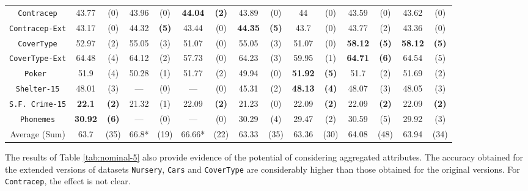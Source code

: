 \begin{sidewaystable*}[ph!]
\begin{tabular}{c|cc|cc|cc|cc|cc|cc|cc}
{\tt Contracep}     & 43.77    & (0)    & 43.96    & (0)    &{\bf44.04}&{\bf(2)}& 43.89    & (0)    & 44       & (0)    & 43.59    & (0)              & 43.62    & (0)      \\
{\tt Contracep-Ext} & 43.17    & (0)    & 44.32    &{\bf(5)}& 43.44    & (0)    &{\bf44.35}&{\bf(5)}& 43.7     & (0)    & 43.77    & (2)              & 43.36    & (0)      \\
{\tt CoverType}     & 52.97    & (2)    & 55.05    & (3)    & 51.07    & (0)    & 55.05    & (3)    & 51.07    & (0)    &{\bf58.12}&{\bf(5)}          &{\bf58.12}& {\bf(5)} \\
{\tt CoverType-Ext} & 64.48    & (4)    & 64.12    & (2)    & 57.73    & (0)    & 64.23    & (3)    & 59.95    & (1)    &{\bf64.71}&{\bf(6)}          & 64.54    & (5)      \\
{\tt Poker }        & 51.9     & (4)    & 50.28    & (1)    & 51.77    & (2)    & 49.94    & (0)    &{\bf51.92}&{\bf(5)}& 51.7     & (2)              & 51.69    & (2)      \\
{\tt Shelter-15}    & 48.01    & (3)    & ---      & (0)    & ---      & (0)    & 45.31    & (2)    &{\bf48.13}&{\bf(4)}& 48.07    & (3)              & 48.05    & (3)      \\  
{\tt S.F. Crime-15} &{\bf22.1} &{\bf(2)}& 21.32    & (1)    & 22.09    &{\bf(2)}& 21.23    & (0)    & 22.09    &{\bf(2)}& 22.09    &{\bf(2)}          & 22.09    & {\bf(2)} \\
{\tt Phonemes}      &{\bf30.92}&{\bf(6)}& ---      & (0)    & ---      & (0)    & 30.29    & (4)    & 29.47    & (2)    & 30.59    & (5)              & 29.92    & (3)      \\
\hline
Average (Sum)       &  63.7    & (35)   & 66.8*    & (19)   & 66.66*   & (22)   & 63.33    & (35)   & 63.36    & (30)   & 64.08    & (48)             & 63.94    & (34)

\end{tabular}
\caption{Average accuracy and statistical tests  for  decision trees with depth at most 5 using only nominal attributes. The best accuracy for each dataset is bold-faced. Experiments that did not finish in reasonable time are considered statistically worse than the others. These criteria have a * mark besides their average accuracies, since they are calculated only on the experiments that finished.}
\label{tab:nominal-5}
\normalsize
\end{sidewaystable*}


The results of  Table \ref{tab:nominal-5} also provide evidence of  the potential of considering aggregated attributes. The accuracy obtained for the extended versions of datasets
{\tt Nursery}, {\tt Cars} and {\tt CoverType} are considerably higher than those obtained for the original versions. For {\tt Contracep}, the effect is not clear.

